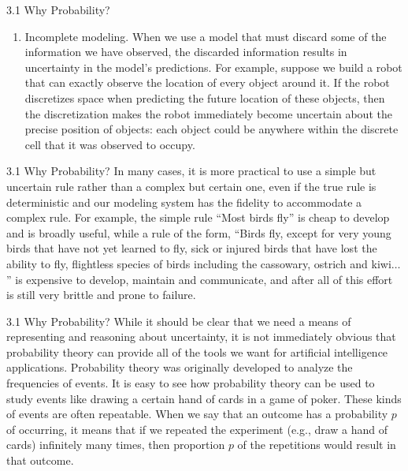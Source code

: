 \begin{frame}{3.1 Why Probability?}
    \begin{enumerate}
        \justifying
        \conti
        \item Incomplete modeling. When we use a model that must discard some of the information we have observed, the discarded information results in uncertainty in the model’s predictions. For example, suppose we build a robot that can exactly observe the location of every object around it. If the robot discretizes space when predicting the future location of these objects, then the discretization makes the robot immediately become uncertain about the precise position of objects: each object could be anywhere within the discrete cell that it was observed to occupy.
        \seti
    \end{enumerate}
\end{frame}

\begin{frame}{3.1 Why Probability?}
    \justifying
    In many cases, it is more practical to use a simple but uncertain rule rather than a complex but certain one, even if the true rule is deterministic and our modeling system has the fidelity to accommodate a complex rule. For example, the simple rule ``Most birds fly'' is cheap to develop and is broadly useful, while a rule of the form, ``Birds fly, except for very young birds that have not yet learned to fly, sick or injured birds that have lost the ability to fly, flightless species of birds including the cassowary, ostrich and kiwi$\dots$'' is expensive to develop, maintain and communicate, and after all of this effort is still very brittle and prone to failure.
\end{frame}

\begin{frame}{3.1 Why Probability?}
    \justifying
    While it should be clear that we need a means of representing and reasoning about uncertainty, it is not immediately obvious that probability theory can provide all of the tools we want for artificial intelligence applications. Probability theory was originally developed to analyze the frequencies of events. It is easy to see how probability theory can be used to study events like drawing a certain hand of cards in a game of poker. These kinds of events are often repeatable. When we say that an outcome has a probability $p$ of occurring, it means that if we repeated the experiment (e.g., draw a hand of cards) infinitely many times, then proportion $p$ of the repetitions would result in that outcome. 
\end{frame}

